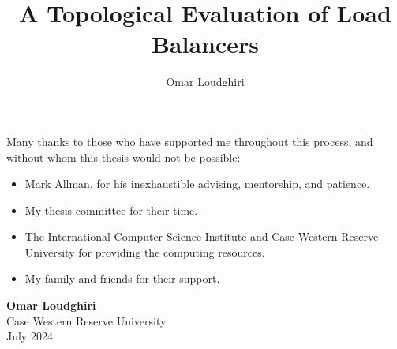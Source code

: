 \documentclass[12pt]{cwru_thesis}
\begin{document}


\title{A Topological Evaluation of Load Balancers} %
\author{Omar Loudghiri} %



\maketitle


\begin{KeepFromToc}
  \tableofcontents
\end{KeepFromToc}
\listoftables
\listoffigures



\begin{acknowledgements}

\noindent Many thanks to those who have supported me throughout this process, and without whom this thesis would not be possible:

\begin{itemize}
    \item Mark Allman, for his inexhaustible advising, mentorship, and patience.
    \item My thesis committee for their time.
    \item The International Computer Science Institute and Case Western Reserve University for providing the computing resources. 
    \item My family and friends for their support.
\end{itemize}

\vspace{2cm}

\begin{flushright}
\textbf{Omar Loudghiri} \\
Case Western Reserve University \\
July 2024
\end{flushright}
\end{acknowledgements}
\end{document}
